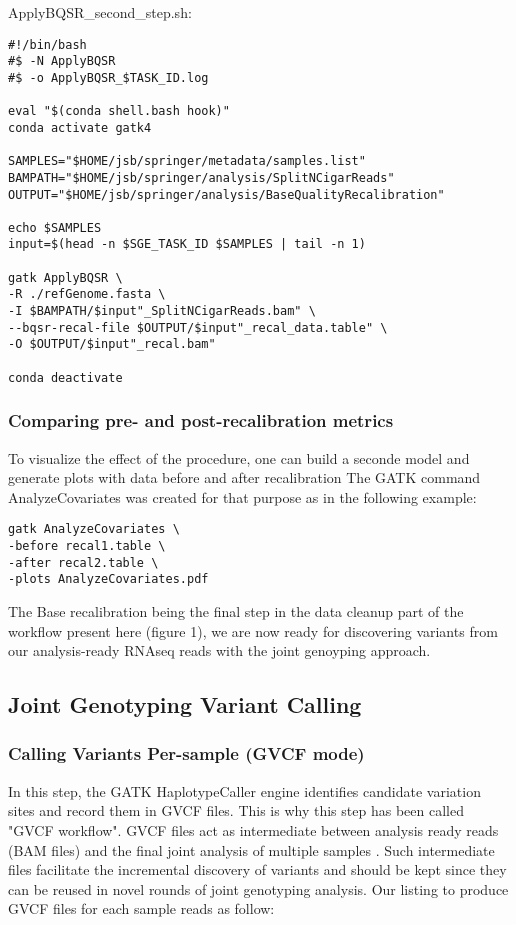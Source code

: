 \noindent ApplyBQSR\_second\_step.sh:
\begin{verbatim}
#!/bin/bash
#$ -N ApplyBQSR
#$ -o ApplyBQSR_$TASK_ID.log

eval "$(conda shell.bash hook)"
conda activate gatk4

SAMPLES="$HOME/jsb/springer/metadata/samples.list"
BAMPATH="$HOME/jsb/springer/analysis/SplitNCigarReads"
OUTPUT="$HOME/jsb/springer/analysis/BaseQualityRecalibration"

echo $SAMPLES
input=$(head -n $SGE_TASK_ID $SAMPLES | tail -n 1)

gatk ApplyBQSR \
-R ./refGenome.fasta \
-I $BAMPATH/$input"_SplitNCigarReads.bam" \
--bqsr-recal-file $OUTPUT/$input"_recal_data.table" \
-O $OUTPUT/$input"_recal.bam"

conda deactivate
\end{verbatim}

\subsubsection{Comparing pre- and post-recalibration metrics}

To visualize the effect of the procedure, one can build a seconde model and generate plots with data before and after recalibration \cite{GATK_BaseQuality} The GATK command AnalyzeCovariates was created for that purpose as in the following example:

\begin{verbatim}
gatk AnalyzeCovariates \
-before recal1.table \
-after recal2.table \
-plots AnalyzeCovariates.pdf
\end{verbatim}

The Base recalibration being the final step in the data cleanup part of the workflow present here (figure 1), we are now ready for discovering variants from our analysis-ready RNAseq reads with the joint genoyping approach.

\subsection{Joint Genotyping Variant Calling}

\subsubsection{Calling Variants Per-sample (GVCF mode)}


In this step, the GATK HaplotypeCaller engine identifies candidate variation sites and record them in GVCF files. This is why this step has been called "GVCF workflow". GVCF files act as intermediate between analysis ready reads (BAM files) and the final joint analysis of multiple samples \cite{GATK_jointCalling_1}. Such intermediate files facilitate the incremental discovery of variants and should be kept since they can be reused in novel rounds of joint genotyping analysis. Our listing to produce GVCF files for each sample reads as follow:


